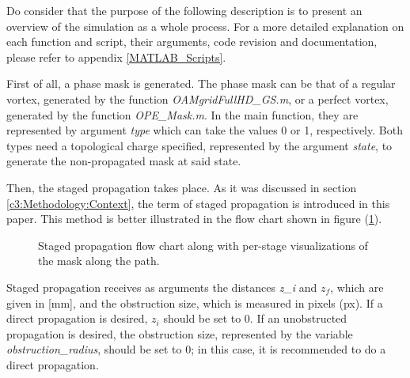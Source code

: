 Do consider that the purpose of the following description is to present an overview of the simulation as a whole process. For a more detailed explanation on each function and script, their arguments, code revision and documentation, please refer to appendix \ref{MATLAB_Scripts}.

First of all, a phase mask is generated. The phase mask can be that of a regular vortex, generated by the function \textit{OAMgridFullHD\_GS.m}, or a perfect vortex, generated by the function \textit{OPE\_Mask.m}. In the main function, they are represented by argument \textit{type} which can take the values 0 or 1, respectively. Both types need a topological charge specified, represented by the argument \textit{state}, to generate the non-propagated mask at said state.

Then, the staged propagation takes place. As it was discussed in section \ref{c3:Methodology:Context}, the term of staged propagation is introduced in this paper. This method is better illustrated in the flow chart shown in figure (\ref{fig:staged_propagation_flow_chart}).

\begin{figure}[htbp]
    \centering
    \caption{Staged propagation flow chart along with per-stage visualizations of the mask along the path.}
    \label{fig:staged_propagation_flow_chart}
\end{figure}

Staged propagation receives as arguments the distances \textit{z\_i} and $z_f$, which are given in [mm], and the obstruction size, which is measured in pixels (px). If a direct propagation is desired, $z_i$ should be set to 0. If an unobstructed propagation is desired, the obstruction size, represented by the variable \textit{obstruction\_radius}, should be set to 0; in this case, it is recommended to do a direct propagation.

